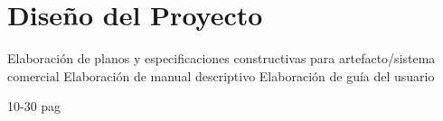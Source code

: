 \chapter{Diseño del Proyecto}


Elaboración de planos y especificaciones
constructivas para artefacto/sistema comercial
Elaboración de manual descriptivo
Elaboración de guía del usuario

10-30 pag